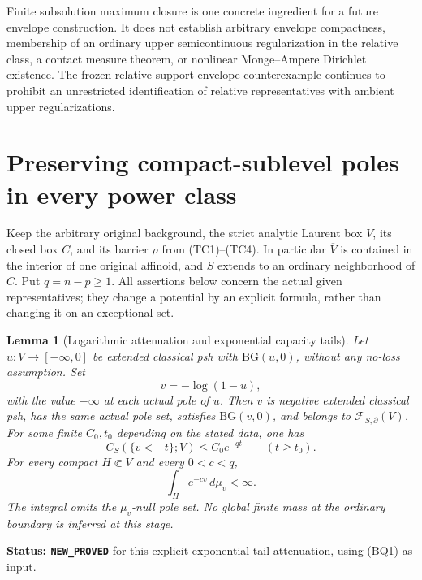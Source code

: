 \documentclass[11pt,a4paper]{article}
\numberwithin{equation}{section}
\newtheorem{lemma}[theorem]{Lemma}
\theoremstyle{definition}
\theoremstyle{remark}
\begin{document}
Finite subsolution maximum closure is one concrete ingredient
for a future envelope construction. It does not establish
arbitrary envelope compactness, membership of an ordinary upper
semicontinuous regularization in the relative class, a contact
measure theorem, or nonlinear Monge--Ampere Dirichlet existence.
The frozen relative-support envelope counterexample continues
to prohibit an unrestricted identification of relative
representatives with ambient upper regularizations.



\section{Preserving compact-sublevel poles in every power class}
\label{sec:r11-logarithmic-pole-representatives}

Keep the arbitrary original background, the strict analytic
Laurent box $V$, its closed box $C$, and its barrier $\rho$
from (TC1)--(TC4). In particular $\overline V$ is contained
in the interior of one original affinoid, and $S$ extends to
an ordinary neighborhood of $C$. Put $q=n-p\geq1$.
All assertions below concern the actual given representatives;
they change a potential by an explicit formula, rather than
changing it on an exceptional set.

\begin{lemma}[Logarithmic attenuation and exponential capacity tails]
\label{lem:r11-logarithmic-attenuation}
Let $u:V\to[-\infty,0]$ be extended classical psh with
$\mathrm{BG}(u,0)$, without any no-loss assumption. Set
\[
                         v=-\log(1-u),
 \tag{LP1}
\]
with the value $-\infty$ at each actual pole of $u$.
Then $v$ is negative extended classical psh, has the same
actual pole set, satisfies $\mathrm{BG}(v,0)$, and belongs
to $\mathcal F_{S,\partial}(V)$. For some finite $C_0,t_0$
depending on the stated data, one has
\[
               C_S(\{v<-t\};V)\leq C_0e^{-qt}
                                     \qquad(t\geq t_0).
 \tag{LP2}
\]
For every compact $H\Subset V$ and every $0<c<q$,
\[
                \int_H e^{-cv}\,d\mu_v<\infty.
 \tag{LP3}
\]
The integral omits the $\mu_v$-null pole set. No global
finite mass at the ordinary boundary is inferred at this stage.
\end{lemma}

\noindent\textbf{Status: \texttt{NEW\_PROVED}} for this
explicit exponential-tail attenuation, using (BQ1) as input.
\end{document}
